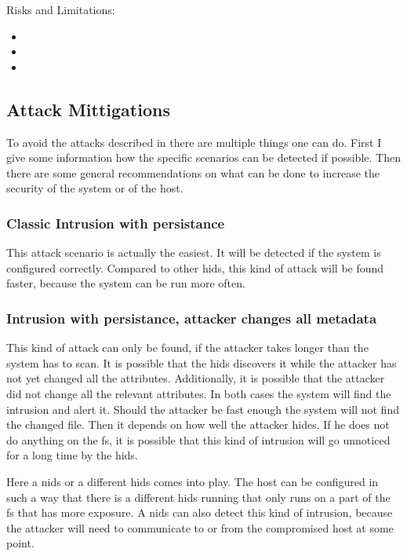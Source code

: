 \documentclass[
	a4paper,					%
	10pt,							%
	twoside,					%
	openright,				%
	notitlepage,			%
	parskip=half,			%
]{scrreprt}					%
\begin{document}
Risks and Limitations:
\begin{itemize}
	\item {}
	\item {}
	\item {}
\end{itemize}

\subsection{Attack Mittigations}
\label{sec:mittigations}

To avoid the attacks described in  there are multiple things one can do. First I give some information how the specific scenarios can be detected if possible. Then there are some general recommendations on what can be done to increase the security of the system or of the host.

\subsubsection{Classic Intrusion with persistance}
\label{sec:defense:classic}

This attack scenario is actually the easiest. It will be detected if the system is configured correctly. Compared to other \gls{hids}, this kind of attack will be found faster, because the system can be run more often. 

\subsubsection{Intrusion with persistance, attacker changes all metadata}
\label{sec:defense:changeattr}

This kind of attack can only be found, if the attacker takes longer than the system has to scan. It is possible that the \gls{hids} discovers it while the attacker has not yet changed all the attributes. Additionally, it is possible that the attacker did not change all the relevant attributes. In both cases the system will find the intrusion and alert it. Should the attacker be fast enough the system will not find the changed file. Then it depends on how well the attacker hides. If he does not do anything on the \gls{fs}, it is possible that this kind of intrusion will go unnoticed for a long time by the \gls{hids}. 

Here a \gls{nids} or a different \gls{hids} comes into play. The host can be configured in such a way that there is a different \gls{hids} running that only runs on a part of the \gls{fs} that has more exposure. A \gls{nids} can also detect this kind of intrusion, because the attacker will need to communicate to or from the compromised host at some point. 
\end{document}
